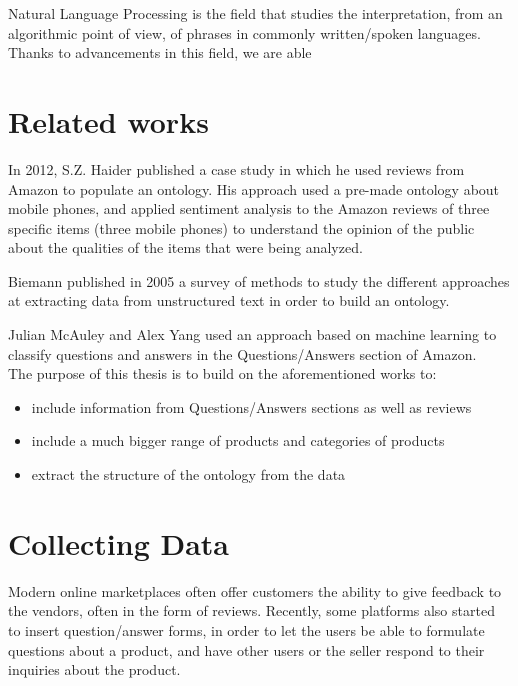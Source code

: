 \documentclass[LaM,binding=0.6cm]{sapthesis}
\begin{document}
 Natural Language Processing is the field that studies the interpretation, from an algorithmic point of view, of phrases in commonly written/spoken languages. Thanks to advancements in this field, we are able 





\chapter{Related works}

In 2012, S.Z. Haider \cite{haider_ontology_2012} published a case study in which he used reviews from Amazon to populate an ontology. His approach used a pre-made ontology about mobile phones, and applied sentiment analysis to the Amazon reviews of three specific items (three mobile phones) to understand the opinion of the public about the qualities of the items that were being analyzed.

Biemann \cite{biemann_ontology_2005} published in 2005 a survey of methods to study the different approaches at extracting data from unstructured text in order to build an ontology. 

Julian McAuley and Alex Yang \cite{mcauley_addressing_2016} used an approach based on machine learning to classify questions and answers in the Questions/Answers section of Amazon.
\\

The purpose of this thesis is to build on the aforementioned works to:
\begin{itemize}
	\item include information from Questions/Answers sections as well as reviews
	\item include a much bigger range of products and categories of products
	\item  extract the structure of the ontology from the data
\end{itemize}

\chapter{Collecting Data}

Modern online marketplaces often offer customers the ability to give feedback to the vendors, often in the form of reviews. Recently, some platforms also started to insert question/answer forms, in order to let the users be able to formulate questions about a product, and have other users or the seller respond to their inquiries about the product. \\
\end{document}
